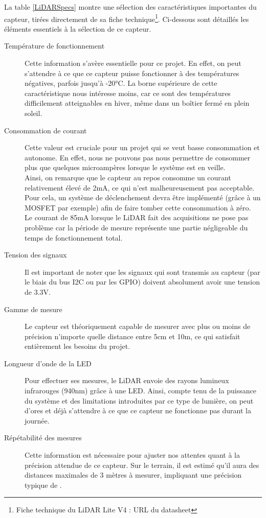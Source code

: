 La table \ref{LiDARSpecs} montre une sélection des caractéristiques importantes du capteur, tirées
directement de sa fiche technique\footnote{Fiche technique du LiDAR Lite V4 : 
URL du datasheet}. Ci-dessous sont détaillés les éléments essentiels à la sélection de ce
capteur.\\

\begin{description}
    \item[Température de fonctionnement] Cette information s'avère essentielle pour ce projet. En
    effet, on peut s'attendre à ce que ce capteur puisse fonctionner à des températures négatives,
    parfois jusqu'à -20°C. La borne supérieure de cette caractéristique nous intéresse moins, car
    ce sont des températures difficilement atteignables en hiver, même dans un boîtier fermé en 
    plein soleil.
    \item[Consommation de courant] Cette valeur est cruciale pour un projet qui se veut basse
    consommation et autonome. En effet, nous ne pouvons pas nous permettre de consommer plus que
    quelques microampères lorsque le système est en veille.\\
    Ainsi, on remarque que le capteur au repos consomme un courant relativement élevé de 2mA, ce
    qui n'est malheureusement pas acceptable. Pour cela, un système de déclenchement devra être
    implémenté (grâce à un MOSFET par exemple) afin de faire tomber cette consommation à zéro.\\
    Le courant de 85mA lorsque le LiDAR fait des acquisitions ne pose pas problème car la période 
    de mesure représente une partie négligeable du temps de fonctionnement total.
    \item[Tension des signaux] Il est important de noter que les signaux qui sont transmis au
    capteur (par le biais du bus I2C ou par les GPIO) doivent absolument avoir une tension de 3.3V.
    \item[Gamme de mesure] Le capteur est théoriquement capable de mesurer avec plus ou moins de
    précision n'importe quelle distance entre 5cm et 10m, ce qui satisfait entièrement les besoins
    du projet.
    \item[Longueur d'onde de la LED] Pour effectuer ses mesures, le LiDAR envoie des rayons lumineux
    infrarouges (940nm) grâce à une LED. Ainsi, compte tenu de la puissance du système et des limitations
    introduites par ce type de lumière, on peut d'ores et déjà s'attendre à ce que ce capteur ne
    fonctionne pas durant la journée.
    \item[Répétabilité des mesures] Cette information est nécessaire pour ajuster nos attentes quant
    à la précision attendue de ce capteur. Sur le terrain, il est estimé qu'il aura des distances 
    maximales de 3 mètres à mesurer, impliquant une précision typique de \textpm 2cm. 
\end{description}

